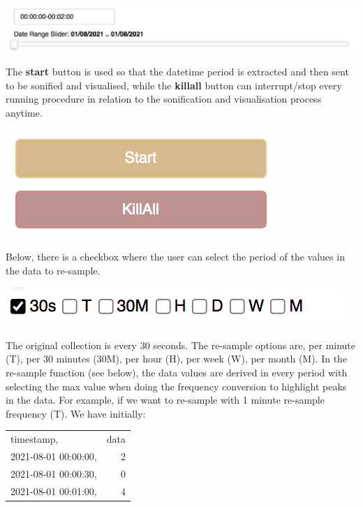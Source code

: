 \documentclass[11pt]{article}
\begin{document}
\begin{center}
\includegraphics[width=.9\linewidth]{./datetime_selection.png}
\end{center}

The \textbf{start} button is used so that the datetime period is extracted and then sent to be sonified and visualised, while the \textbf{killall} button can interrupt/stop every running procedure in relation to the sonification and visualisation process anytime.

\begin{center}
\includegraphics[width=.9\linewidth]{./start_kill_buttons.png}
\end{center}

Below, there is a checkbox where the user can select the period of the values in the data to re-sample.

\begin{center}
\includegraphics[width=.9\linewidth]{./resample_checkbox.png}
\end{center}

The original collection is every 30 seconds.  The re-sample options are, per minute (T), per 30 minutes (30M), per hour (H), per week (W), per month (M).  In the re-sample function (see below), the data values are derived in every period with selecting the max value when doing the frequency conversion to highlight peaks in the data.  For example, if we want to re-sample with 1 minute re-sample frequency (T). We have initially:
\begin{center}
\begin{tabular}{lr}
\hline
timestamp, & data\\
2021-08-01 00:00:00, & 2\\
2021-08-01 00:00:30, & 0\\
2021-08-01 00:01:00, & 4\\
\hline
\end{tabular}
\end{center}
\end{document}
